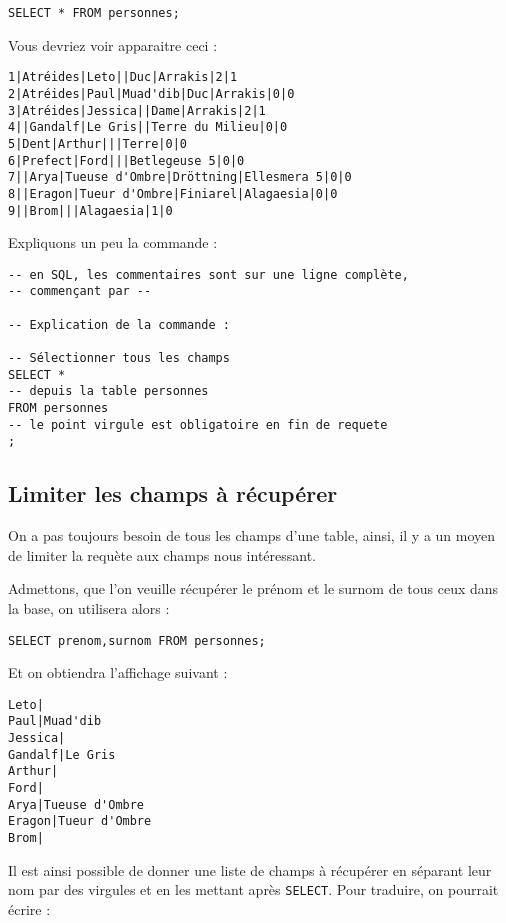 \documentclass[a4paper, 11pt]{report}
\begin{document}
\begin{verbatim}
SELECT * FROM personnes;
\end{verbatim}

Vous devriez voir apparaitre ceci :

\begin{verbatim}
1|Atréides|Leto||Duc|Arrakis|2|1
2|Atréides|Paul|Muad'dib|Duc|Arrakis|0|0
3|Atréides|Jessica||Dame|Arrakis|2|1
4||Gandalf|Le Gris||Terre du Milieu|0|0
5|Dent|Arthur|||Terre|0|0
6|Prefect|Ford|||Betlegeuse 5|0|0
7||Arya|Tueuse d'Ombre|Dröttning|Ellesmera 5|0|0
8||Eragon|Tueur d'Ombre|Finiarel|Alagaesia|0|0
9||Brom|||Alagaesia|1|0
\end{verbatim}

Expliquons un peu la commande :

\begin{verbatim}
-- en SQL, les commentaires sont sur une ligne complète,
-- commençant par --

-- Explication de la commande :

-- Sélectionner tous les champs
SELECT *
-- depuis la table personnes
FROM personnes
-- le point virgule est obligatoire en fin de requete
;
\end{verbatim}

\subsection{Limiter les champs à récupérer}

On a pas toujours besoin de tous les champs d'une table, ainsi, il y a un moyen de limiter la requète aux champs nous intéressant.

Admettons, que l'on veuille récupérer le prénom et le surnom de tous ceux dans la base, on utilisera alors :

\begin{verbatim}
SELECT prenom,surnom FROM personnes;
\end{verbatim}

Et on obtiendra l'affichage suivant :

\begin{verbatim}
Leto|
Paul|Muad'dib
Jessica|
Gandalf|Le Gris
Arthur|
Ford|
Arya|Tueuse d'Ombre
Eragon|Tueur d'Ombre
Brom|
\end{verbatim}

Il est ainsi possible de donner une liste de champs à récupérer en séparant leur nom par des virgules et en les mettant après \texttt{SELECT}.
Pour traduire, on pourrait écrire :
\end{document}
